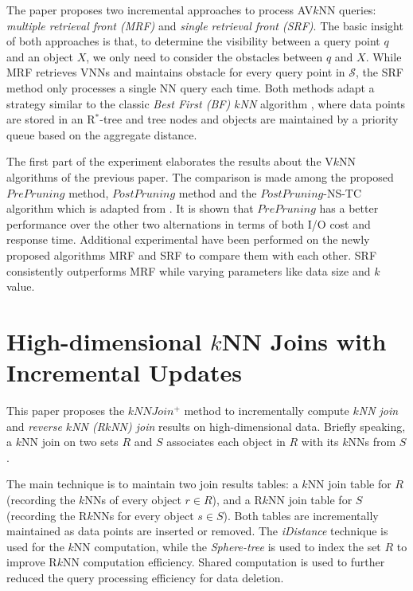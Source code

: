 \documentclass[paper=a4, fontsize=18pt]{article} %
\numberwithin{equation}{section} %
\numberwithin{figure}{section} %
\numberwithin{table}{section} %
\begin{document}
The paper proposes two incremental approaches to process AV$k$NN queries: \emph{multiple retrieval front (MRF)} and \emph{single retrieval front (SRF)}. The basic insight of both approaches is that, to determine the visibility between a query point $q$ and an object $X$, we only need to consider the obstacles between $q$ and $X$. While MRF retrieves VNNs and maintains obstacle for every query point in $\mathcal{S}$, the SRF method only processes a single NN query each time. Both methods adapt a strategy similar to the classic \emph{Best First (BF) $k$NN} algorithm \cite{HS99}, where data points are stored in an R$^*$-tree and tree nodes and objects are maintained by a priority queue based on the aggregate distance.

The first part of the experiment elaborates the results about the V$k$NN algorithms of the previous paper. The comparison is made among the proposed $PrePruning$ method, $PostPruning$ method and the $PostPruning$-NS-TC algorithm which is adapted from \cite{LLL06}. It is shown that $PrePruning$ has a better performance over the other two alternations in terms of both I/O cost and response time. Additional experimental have been performed on the newly proposed algorithms MRF and SRF to compare them with each other. SRF consistently outperforms MRF while varying parameters like data size and $k$ value.


\section{High-dimensional $k$NN Joins with Incremental Updates \cite{YZHX10}}

This paper proposes the $kNNJoin^+$ method to incrementally compute \emph{$k$NN join} and \emph{reverse $k$NN (R$k$NN) join} results on high-dimensional data. Briefly speaking, a $k$NN join on two sets $R$ and $S$ associates each object in $R$ with its $k$NNs from $S$.

The main technique is to maintain two join results tables: a $k$NN join table for $R$ (recording the $k$NNs of every object $r \in R$), and a R$k$NN join table for $S$ (recording the R$k$NNs for every object $s \in S$). Both tables are incrementally maintained as data points are inserted or removed. The \emph{iDistance} technique \cite{OYTJ01} is used for the $k$NN computation, while the \emph{Sphere-tree} is used to index the set $R$ to improve R$k$NN computation efficiency. Shared computation is used to further reduced the query processing efficiency for data deletion.
\end{document}
